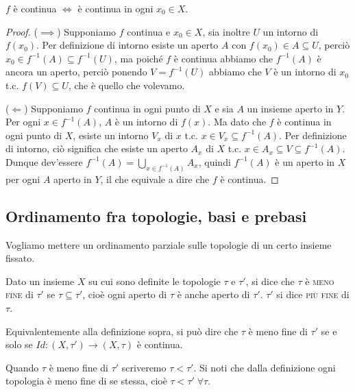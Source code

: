 \documentclass{article}
\begin{document}
\begin{thm}
	$f$ è continua $\Leftrightarrow$ è continua in ogni $x_0 \in X$.
\end{thm}

\begin{proof}
	($\implies$) Supponiamo $f$ continua e $x_0 \in X$, sia inoltre $U$ un intorno di $f(x_0)$. Per definizione di intorno esiste un aperto $A$ con $f(x_0) \in A \subseteq U$, perciò $x_0 \in f^{-1}(A) \subseteq f^{-1}(U)$, ma poiché $f$ è continua abbiamo che $f^{-1}(A)$ è ancora un aperto, perciò ponendo $V=f^{-1}(U)$ abbiamo che $V$ è un intorno di $x_0$ t.c. $f(V) \subseteq U$, che è quello che volevamo.

	($\Leftarrow$) Supponiamo $f$ continua in ogni punto di $X$ e sia $A$ un insieme aperto in $Y$. Per ogni $x \in f^{-1}(A)$, $A$ è un intorno di $f(x)$. Ma dato che $f$ è continua in ogni punto di $X$, esiste un intorno $V_x$ di $x$ t.c. $x \in V_x \subseteq f^{-1}(A)$. Per definizione di intorno, ciò significa che esiste un aperto $A_x$ di $X$ t.c. $x \in A_x \subseteq V \subseteq f^{-1}(A)$. Dunque dev'essere $\displaystyle f^{-1}(A)= \bigcup_{x \in f^{-1}(A)} A_x$,
	quindi $f^{-1}(A)$ è un aperto in $X$ per ogni $A$ aperto in $Y$, il che equivale a dire che $f$ è continua.
\end{proof}

\subsection{Ordinamento fra topologie, basi e prebasi}

Vogliamo mettere un ordinamento parziale sulle topologie di un certo insieme
fissato.

\begin{defn}
    Dato un insieme $X$ su cui sono definite le topologie $\tau$ e $\tau'$, si
    dice che $\tau$ \`e \textsc{meno fine} di $\tau'$ se $\tau \subseteq \tau'$,
    cioè ogni aperto di $\tau$ è anche aperto di $\tau'$. $\tau'$ si dice
    \textsc{più fine} di $\tau$.
\end{defn}

\begin{oss}
    Equivalentemente alla definizione sopra, si pu\`o dire che $\tau$ \`e meno
    fine di $\tau'$ se e solo se ${Id:(X,\tau')\rightarrow(X, \tau)}$ \`e
    continua.
\end{oss}

Quando $\tau$ è meno fine di $\tau'$ scriveremo $\tau < \tau'$. Si noti che
dalla definizione ogni topologia è meno fine di se stessa, cioè $\tau < \tau'
\; \forall \tau$.
\end{document}
